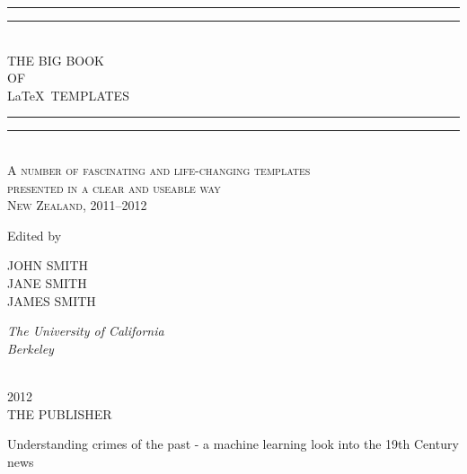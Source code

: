 \newcommand*{\titleGP}{\begingroup %
\centering %
\vspace*{\baselineskip} %

\rule{\textwidth}{1.6pt}\vspace*{-\baselineskip}\vspace*{2pt} %
\rule{\textwidth}{0.4pt}\\[\baselineskip] %

{\LARGE THE BIG BOOK\\ OF \\[0.3\baselineskip] \LaTeX ~TEMPLATES}\\[0.2\baselineskip] %

\rule{\textwidth}{0.4pt}\vspace*{-\baselineskip}\vspace{3.2pt} %
\rule{\textwidth}{1.6pt}\\[\baselineskip] %

\scshape %
A number of fascinating and life-changing templates \\ %
presented  in a clear and useable way \\[\baselineskip] %
New Zealand,  2011--2012\par %

\vspace*{2\baselineskip} %

Edited by \\[\baselineskip]
{\Large JOHN SMITH \\ JANE SMITH \\ JAMES SMITH\par} %
{\itshape The University of California \\ Berkeley\par} %

\vfill %

\plogo \\[0.3\baselineskip] %
{\scshape 2012} \\[0.3\baselineskip] %
{\large THE PUBLISHER}\par %

\endgroup}


 

\pagestyle{empty} %

\titleGP Understanding crimes of the past  - a machine learning look into the 19th Century news


